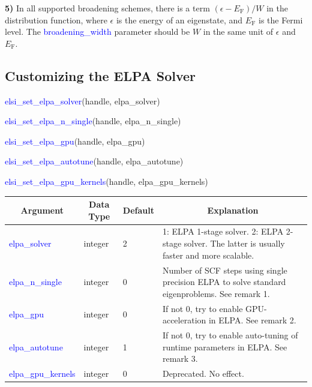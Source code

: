 \documentclass{report}
\newcommand{\tcb}[1]{\textcolor{blue}{#1}}
\begin{document}
\textbf{5)} In all supported broadening schemes, there is a term $(\epsilon - E_\text{F})/W$ in the distribution function, where $\epsilon$ is the energy of an eigenstate, and $E_\text{F}$ is the Fermi level. The \tcb{broadening\_width} parameter should be $W$ in the same unit of $\epsilon$ and $E_\text{F}$.

\subsection{Customizing the ELPA Solver}
\label{subsec:setter_elpa}
\begin{labeling}{\hspace{6cm}}
\item [\hspace{0.3cm} \tcb{elsi\_set\_elpa\_solver}(handle, elpa\_solver)]
\item [\hspace{0.3cm} \tcb{elsi\_set\_elpa\_n\_single}(handle, elpa\_n\_single)]
\item [\hspace{0.3cm} \tcb{elsi\_set\_elpa\_gpu}(handle, elpa\_gpu)]
\item [\hspace{0.3cm} \tcb{elsi\_set\_elpa\_autotune}(handle, elpa\_autotune)]
\item [\hspace{0.3cm} \tcb{elsi\_set\_elpa\_gpu\_kernels}(handle, elpa\_gpu\_kernels)]
\end{labeling}

\begin{tabular}[]{|p{30mm}|p{20mm}|p{15mm}|p{100mm}|}
\hline
\multicolumn{1}{|c|}{\textbf{Argument}} & \multicolumn{1}{c|}{\textbf{Data Type}} & \multicolumn{1}{c|}{\textbf{Default}} & \multicolumn{1}{c|}{\textbf{Explanation}}\\
\hline
\tcb{elpa\_solver}       & integer & 2 & 1: ELPA 1-stage solver. 2: ELPA 2-stage solver. The latter is usually faster and more scalable.\\
\hline
\tcb{elpa\_n\_single}    & integer & 0 & Number of SCF steps using single precision ELPA to solve standard eigenproblems. See remark 1.\\
\hline
\tcb{elpa\_gpu}          & integer & 0 & If not 0, try to enable GPU-acceleration in ELPA. See remark 2.\\
\hline
\tcb{elpa\_autotune}     & integer & 1 & If not 0, try to enable auto-tuning of runtime parameters in ELPA. See remark 3.\\
\hline
\tcb{elpa\_gpu\_kernels} & integer & 0 & Deprecated. No effect.\\
\hline
\end{tabular}
\end{document}

